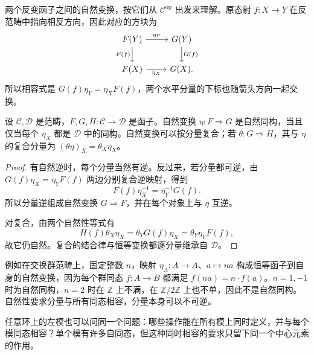 \ProseParagraphBreak
两个反变函子之间的自然变换，按它们从 \(\mathcal C^{\mathrm{op}}\) 出发来理解。原态射 \(f:X\rightarrow Y\) 在反范畴中指向相反方向，因此对应的方块为
\[
	\begin{tikzcd}
		F(Y)\arrow[r,"\eta_Y"]\arrow[d,"F(f)"']&G(Y)\arrow[d,"G(f)"]\\
		F(X)\arrow[r,"\eta_X"']&G(X).
	\end{tikzcd}
\]
所以相容式是 \(G(f)\eta_Y=\eta_XF(f)\)，两个水平分量的下标也随箭头方向一起交换。

\begin{proposition}\label{b2:prop:natural-isomorphism-components}
	设 \(\mathcal C,\mathcal D\) 是范畴，\(F,G,H:\mathcal C\to\mathcal D\) 是函子。自然变换 \(\eta:F\Rightarrow G\) 是自然同构，当且仅当每个 \(\eta_X\) 都是 \(\mathcal D\) 中的同构。自然变换可以按分量复合；若 \(\theta:G\Rightarrow H\)，其与 \(\eta\) 的复合分量为 \((\theta\eta)_X=\theta_X\eta_X\)。
\end{proposition}
\begin{proof}
	有自然逆时，每个分量当然有逆。反过来，若分量都可逆，由 \(G(f)\eta_X=\eta_YF(f)\) 两边分别复合逆映射，得到
	\[
		F(f)\eta_X^{-1}=\eta_Y^{-1}G(f).
	\]
	所以分量逆组成自然变换 \(G\Rightarrow F\)，并在每个对象上与 \(\eta\) 互逆。

	对复合，由两个自然性等式有
	\[
		H(f)\theta_X\eta_X=\theta_YG(f)\eta_X=\theta_Y\eta_YF(f),
	\]
	故它仍自然。复合的结合律与恒等变换都逐分量继承自 \(\mathcal D\)。
\end{proof}

例如在交换群范畴上，固定整数 \(n\)，映射 \(\eta_A:A\rightarrow A\)、\(a\mapsto na\) 构成恒等函子到自身的自然变换，因为每个群同态 \(f:A\rightarrow B\) 都满足 \(f(na)=n\cdot f(a)\)。\(n=1,-1\) 时为自然同构，\(n=2\) 时在 \(\mathbb Z\) 上不满，在 \(\mathbb Z/2\mathbb Z\) 上也不单，因此不是自然同构。自然性要求分量与所有同态相容，分量本身可以不可逆。

\ProseParagraphBreak
任意环上的左模也可以问同一个问题：哪些操作能在所有模上同时定义，并与每个模同态相容？单个模有许多自同态，但这种同时相容的要求只留下同一个中心元素的作用。

